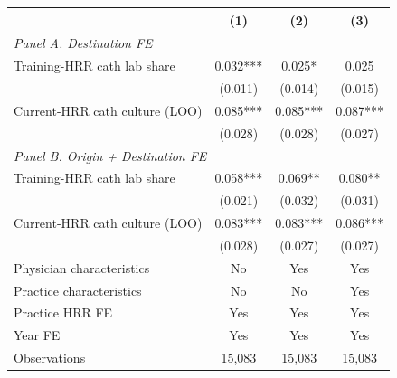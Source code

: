\begin{tabular}{lccc}
\toprule
 & (1) & (2) & (3) \\
\midrule
\multicolumn{4}{l}{\textit{Panel A. Destination FE}} \\
Training-HRR cath lab share & 0.032*** & 0.025* & 0.025 \\
 & (0.011) & (0.014) & (0.015) \\
Current-HRR cath culture (LOO) & 0.085*** & 0.085*** & 0.087*** \\
 & (0.028) & (0.028) & (0.027) \\
\midrule
\multicolumn{4}{l}{\textit{Panel B. Origin + Destination FE}} \\
Training-HRR cath lab share & 0.058*** & 0.069** & 0.080** \\
 & (0.021) & (0.032) & (0.031) \\
Current-HRR cath culture (LOO) & 0.083*** & 0.083*** & 0.086*** \\
 & (0.028) & (0.027) & (0.027) \\
\midrule
Physician characteristics & No & Yes & Yes \\
Practice characteristics & No & No & Yes \\
Practice HRR FE & Yes & Yes & Yes \\
Year FE & Yes & Yes & Yes \\
Observations & 15,083 & 15,083 & 15,083 \\
\bottomrule
\end{tabular}

